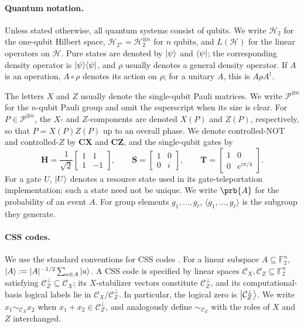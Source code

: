 \paragraph{Quantum notation.}
Unless stated otherwise, all quantum systems consist of qubits. We write $\mathcal H_2$ for the one-qubit Hilbert space, $\mathcal H_{2^n}=\mathcal H_2^{\otimes n}$ for $n$ qubits, and $L(\mathcal H)$ for the linear operators on $\mathcal H$. Pure states are denoted by $\ket\psi$ and $\bra\psi$; the corresponding density operator is $\ket\psi\!\bra\psi$, and $\rho$ usually denotes a general density operator. If $A$ is an operation, $A\circ\rho$ denotes its action on $\rho$; for a unitary $A$, this is $A\rho A^\dagger$.

The letters $X$ and $Z$ usually denote the single-qubit Pauli matrices. We write $\mathcal P^{\otimes n}$ for the $n$-qubit Pauli group and omit the superscript when its size is clear. For $P\in\mathcal P^{\otimes n}$, the $X$- and $Z$-components are denoted $X(P)$ and $Z(P)$, respectively, so that $P=X(P)Z(P)$ up to an overall phase. We denote controlled-NOT and controlled-$Z$ by $\mathbf{CX}$ and $\mathbf{CZ}$, and the single-qubit gates by
\begin{equation*}
 \mathbf H=\frac{1}{\sqrt 2}\begin{bmatrix}1&1\\1&-1\end{bmatrix},\qquad
 \mathbf S=\begin{bmatrix}1&0\\0&i\end{bmatrix},\qquad
 \mathbf T=\begin{bmatrix}1&0\\0&e^{i\pi/4}\end{bmatrix}.
\end{equation*}
For a gate $U$, $\ket U$ denotes a resource state used in its gate-teleportation implementation; such a state need not be unique. We write $\prb{A}$ for the probability of an event $A$. For group elements $g_1,\ldots,g_\ell$, $\langle g_1,\ldots,g_\ell\rangle$ is the subgroup they generate.

\paragraph{CSS codes.}
We use the standard conventions for CSS codes \cite{Calderbank_1996,Steane_1996}. For a linear subspace $A\subseteq\mathbb F_2^n$, $\ket A:=|A|^{-1/2}\sum_{a\in A}\ket a$. A CSS code is specified by linear spaces $\mathcal C_X,\mathcal C_Z\subseteq\mathbb F_2^n$ satisfying $\mathcal C_Z^\perp\subseteq\mathcal C_X$; its $X$-stabilizer vectors constitute $\mathcal C_Z^\perp$, and its computational-basis logical labels lie in $\mathcal C_X/\mathcal C_Z^\perp$. In particular, the logical zero is $\ket{\mathcal C_Z^\perp}$. We write $x_1\sim_{\mathcal C_X}x_2$ when $x_1+x_2\in\mathcal C_Z^\perp$, and analogously define $\sim_{\mathcal C_Z}$ with the roles of $X$ and $Z$ interchanged.
